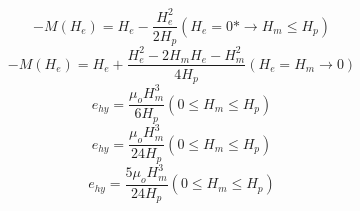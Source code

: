 \begin{equation}%
-M(H_e)=H_e-\frac{H_{e}^{2}}{2H_p}        (H_e=0*\rightarrow H_m\leq H_p)
\end{equation}
\begin{equation}%
-M(H_e)=H_e+\frac{H_{e}^{2}-2H_mH_e-H_{m}^{2}}{4H_p}      (H_e=H_m\rightarrow 0)
\end{equation}
\begin{equation}%
e_{hy}=\frac{\mu_oH_{m}^{3}}{6H_p}        (0\leq H_m\leq H_p)
\end{equation}
\begin{equation}%
e_{hy}=\frac{\mu_oH_{m}^{3}}{24H_p}       (0\leq H_m\leq H_p)
\end{equation}
\begin{equation}%
e_{hy}=\frac{5\mu_oH_{m}^{3}}{24H_p}      (0\leq H_m\leq H_p)
\end{equation}

